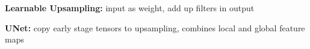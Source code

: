 \textbf{Learnable Upsampling:} input as weight, add up filters in output\\

\textbf{UNet:} copy early stage tensors to upsampling, combines local and global feature maps\\

